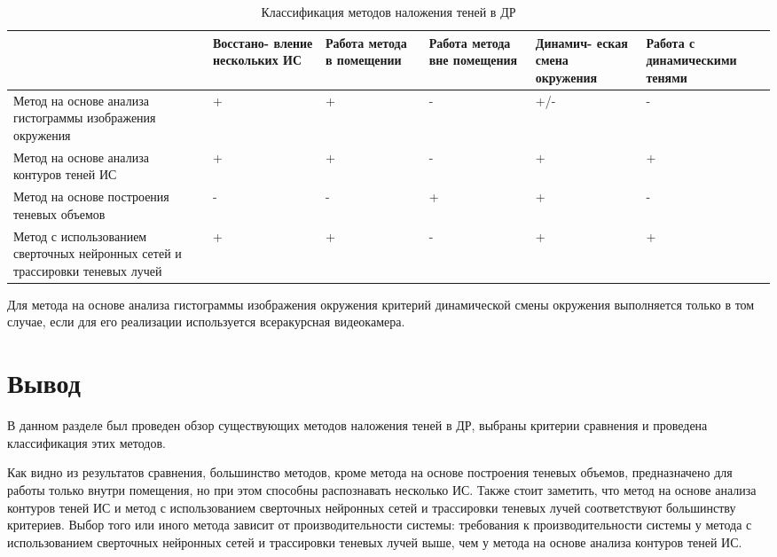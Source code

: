 \begin{table}[H]
	\caption{Классификация методов наложения теней в ДР}
	\label{class}
	\begin{center}
		\begin{tabular}{| p{4 cm} | p{2 cm} | p{2 cm} | p{2 cm} | p{2 cm} | p{2 cm} |} 
			\hline
			& Восстано- вление нескольких ИС & Работа метода в помещении & Работа метода вне помещения & Динамич- еская смена окружения & Работа с динамическими тенями \\
			\hline
			Метод на основе анализа гистограммы изображения окружения & + & + & - & +/- & - \\
			\hline
			Метод на основе анализа контуров теней ИС & + & + & - & + & + \\
			\hline
			Метод на основе построения теневых объемов & - & - & + & + & - \\
			\hline
			Метод с использованием сверточных нейронных сетей и трассировки теневых лучей & + & + & - & + & + \\
			\hline
		\end{tabular}
	\end{center}
\end{table}

Для метода на основе анализа гистограммы изображения окружения критерий динамической смены окружения выполняется только в том случае, если для его реализации используется всеракурсная видеокамера.

\section*{Вывод}

В данном разделе был проведен обзор существующих методов наложения теней в ДР, выбраны критерии сравнения и проведена классификация этих методов.

Как видно из результатов сравнения, большинство методов, кроме метода на основе построения теневых объемов, предназначено для работы только внутри помещения, но при этом способны распознавать несколько ИС. Также стоит заметить, что метод на основе анализа контуров теней ИС и метод с использованием сверточных нейронных сетей и трассировки теневых лучей соответствуют большинству критериев. Выбор того или иного метода зависит от производительности системы: требования к производительности системы у метода с использованием сверточных нейронных сетей и трассировки теневых лучей выше, чем у метода на основе анализа контуров теней ИС.